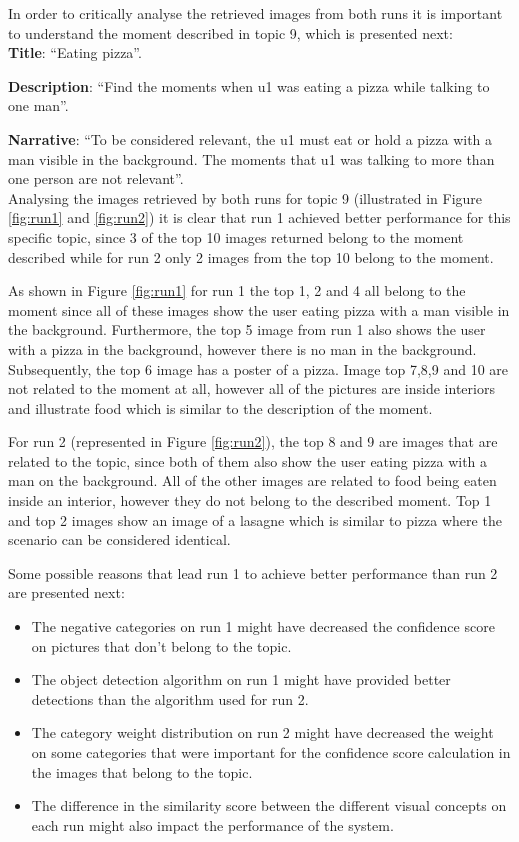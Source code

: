 In order to critically analyse the retrieved images from both runs it is important to understand the moment described in topic 9, which is presented next:\\



\textbf{Title}: \enquote{Eating pizza}.

\textbf{Description}: \enquote{Find the moments when u1 was eating a pizza
while talking to one man}.

\textbf{Narrative}: \enquote{To be considered relevant, the u1 must eat or
hold a pizza with a man visible in the background. The moments that
u1 was talking to more than one person are not relevant}.\\


Analysing the images retrieved by both runs for topic 9 (illustrated in Figure \ref{fig:run1} and \ref{fig:run2}) it is clear that run 1 achieved better performance for this specific topic, since 3 of the top 10 images returned belong to the moment described while for run 2 only 2 images from the top 10 belong to the moment. 


As shown in Figure \ref{fig:run1} for run 1 the  top 1, 2 and 4 all belong to the moment since all of these images show the user eating pizza with a man visible in the background. Furthermore, the top 5 image from run 1 also shows the user with a pizza in the background, however there is no man in the background. Subsequently, the top 6 image has a poster of a pizza. Image top 7,8,9 and 10 are not related to the moment at all, however all of the pictures are inside interiors and illustrate food which is similar to the description of the moment.

  
For run 2 (represented in Figure \ref{fig:run2}), the top 8 and 9 are images that are related to the topic, since both of them also show the user eating pizza with a man on the background. All of the other images are related to food being eaten inside an interior, however they do not belong to the described moment. Top 1 and top 2 images show an image of a lasagne which is similar to pizza where the scenario can be considered identical.

Some possible reasons that lead run 1 to achieve better performance than run 2 are presented next:

\begin{itemize}
  \itemsep0em
  \item The negative categories on run 1 might have decreased the confidence score on  pictures that don't belong to the topic.
  \item The object detection algorithm on run 1 might have provided better detections than the algorithm used for run 2.
  \item The category weight distribution on run 2 might have decreased the weight on some categories that were important for the confidence score calculation in the images that belong to the topic.
  \item The difference in the similarity score between the different visual concepts on each run might also impact the performance of the system.
\end{itemize}

